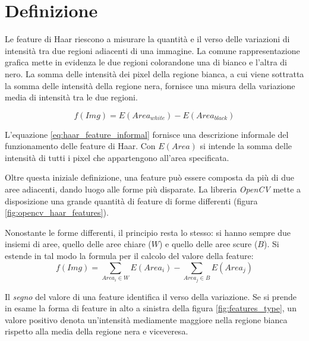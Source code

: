     \section{Definizione} %
    \label{sec:definizione}
        Le feature di Haar riescono a misurare la quantità e il verso delle variazioni di intensità tra due regioni adiacenti di una immagine.
        La comune rappresentazione grafica mette in evidenza le due regioni colorandone una di bianco e l'altra di nero.
        La somma delle intensità dei pixel della regione bianca, a cui viene sottratta la somma delle intensità della regione nera, fornisce una misura della variazione media di intensità tra le due regioni.

        \begin{equation}
            \label{eq:haar_feature_informal}
            f(Img) = E(Area_{white}) - E(Area_{black})
        \end{equation}

        L'equazione \ref{eq:haar_feature_informal} fornisce una descrizione informale del funzionamento delle feature di Haar. Con $E(Area)$ si intende la somma delle intensità di tutti i pixel che appartengono all'area specificata.

        Oltre questa iniziale definizione, una feature può essere composta da più di due aree adiacenti, dando luogo alle forme più disparate.
        La libreria \emph{OpenCV} mette a disposizione una grande quantità di feature di forme differenti (figura \ref{fig:opencv_haar_features}).

        Nonostante le forme differenti, il principio resta lo stesso: si hanno sempre due insiemi di aree, quello delle aree chiare ($W$) e quello delle aree scure ($B$).
        Si estende in tal modo la formula per il calcolo del valore della feature:
        \begin{equation}
            \label{eq;haar_feature_general}
            f(Img) = \sum_{Area_i \in W}E(Area_i) - \sum_{Area_j \in B}E(Area_j) 
        \end{equation}

        Il \emph{segno} del valore di una feature identifica il verso della variazione. Se si prende in esame la forma di feature in alto a sinistra della figura \ref{fig:features_type}, un valore positivo denota un'intensità mediamente maggiore nella regione bianca rispetto alla media della regione nera e viceveresa.

